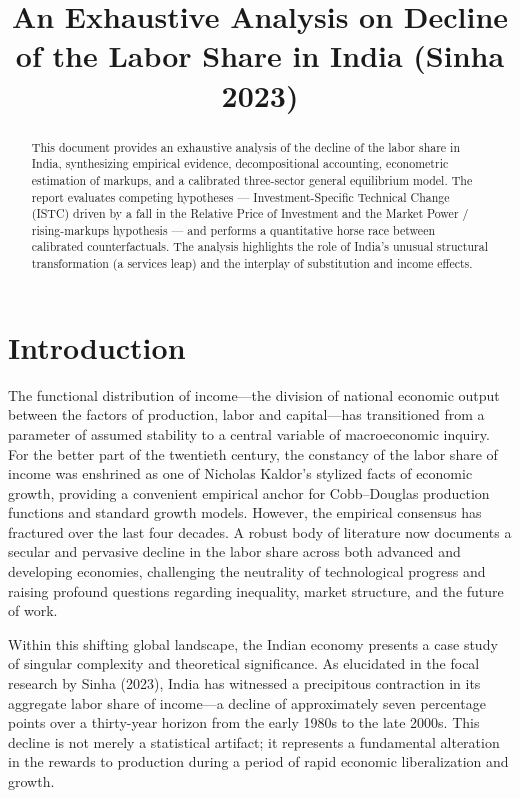 \documentclass[12pt]{article}
\title{\textbf {An Exhaustive Analysis on Decline of the Labor Share in India (Sinha 2023)}}
\date{}
\begin{document}
\maketitle
\vspace{-2cm}
\begin{abstract}
This document provides an exhaustive analysis of the decline of the labor share in India, synthesizing empirical evidence, decompositional accounting, econometric estimation of markups, and a calibrated three-sector general equilibrium model. The report evaluates competing hypotheses — Investment-Specific Technical Change (ISTC) driven by a fall in the Relative Price of Investment and the Market Power / rising-markups hypothesis — and performs a quantitative horse race between calibrated counterfactuals. The analysis highlights the role of India's unusual structural transformation (a services leap) and the interplay of substitution and income effects.
\end{abstract}

\tableofcontents
\newpage

\section{Introduction}
The functional distribution of income—the division of national economic output between the factors of production, labor and capital—has transitioned from a parameter of assumed stability to a central variable of macroeconomic inquiry. For the better part of the twentieth century, the constancy of the labor share of income was enshrined as one of Nicholas Kaldor’s stylized facts of economic growth, providing a convenient empirical anchor for Cobb–Douglas production functions and standard growth models. However, the empirical consensus has fractured over the last four decades. A robust body of literature now documents a secular and pervasive decline in the labor share across both advanced and developing economies, challenging the neutrality of technological progress and raising profound questions regarding inequality, market structure, and the future of work.

Within this shifting global landscape, the Indian economy presents a case study of singular complexity and theoretical significance. As elucidated in the focal research by Sinha (2023), India has witnessed a precipitous contraction in its aggregate labor share of income—a decline of approximately seven percentage points over a thirty-year horizon from the early 1980s to the late 2000s. This decline is not merely a statistical artifact; it represents a fundamental alteration in the rewards to production during a period of rapid economic liberalization and growth.
\end{document}

